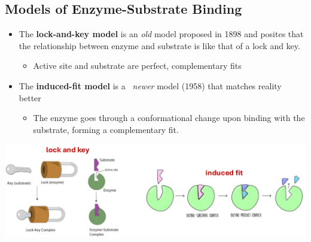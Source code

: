 \documentclass[10pt]{article}
\begin{document}
\subsection*{Models of Enzyme-Substrate Binding}
\begin{itemize}
    \item The \textbf{lock-and-key model} is an \textit{old} model proposed in 1898 and posites that the relationship between enzyme and substrate is like that of a lock and key.
    \begin{itemize}
        \item Active site and substrate are perfect, complementary fits
    \end{itemize}
    \item The \textbf{induced-fit model}  is a \textit{~newer} model (1958) that matches reality better
    \begin{itemize}
        \item The enzyme goes through a conformational change upon binding with the substrate, forming a complementary fit.
    \end{itemize}
\end{itemize}
\begin{center}
    \includegraphics*[width=\textwidth]{L1_12.png}
\end{center}
\end{document}
